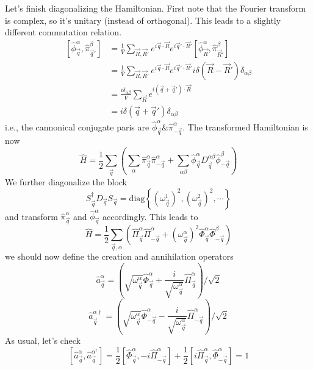 Let's finish diagonalizing the Hamiltonian. First note that the Fourier transform is complex, so it's unitary (instead of orthogonal). This leads to a slightly different commutation relation.
\begin{align*}
    \left[ \hat{\phi}_{\vec{q}}^{\alpha},\hat{\pi}_{\vec{q}'}^{\beta} \right] &=\frac{1}{V}\sum_{\vec{R},\vec{R}'}{e^{i\vec{q}\cdot \vec{R}}e^{i\vec{q}'\cdot \vec{R}'}\left[ \hat{\phi}_{\vec{R}}^{\alpha},\hat{\pi}_{\vec{R}'}^{\beta} \right]}\\
    &=\frac{1}{V}\sum_{\vec{R},\vec{R}'}{e^{i\vec{q}\cdot \vec{R}}e^{i\vec{q}'\cdot \vec{R}'}i\delta \left( \vec{R}-\vec{R}' \right) \delta _{\alpha \beta}}\\
    &=\frac{i\delta _{\alpha \beta}}{V}\sum_{\vec{R}}{e^{i\left( \vec{q}+\vec{q}' \right) \cdot \vec{R}}}\\
    &=i\delta \left( \vec{q}+\vec{q}' \right) \delta _{\alpha \beta}
\end{align*}
i.e., the cannonical conjugate paris are $\hat{\phi}_{\vec{q}}^\alpha \& \hat{\pi}_{-\vec{q}}^\alpha$. The transformed Hamiltonian is now
\[ \hat{H}=\frac{1}{2}\sum_{\vec{q}}{\left( \sum_{\alpha}{\hat{\pi}_{\vec{q}}^{\alpha}\hat{\pi}_{-\vec{q}}^{\alpha}}+\sum_{\alpha \beta}{\hat{\phi}_{\vec{q}}^{\alpha}D_{\vec{q}}^{\alpha \beta}\hat{\phi}_{-\vec{q}}^{\beta}} \right)}\]
We further diagonalize the block
\[ S_{\vec{q}}^{\dagger}D_{\vec{q}}S_{\vec{q}}=\mathrm{diag}\left\{ \left( \omega _{\vec{q}}^{1} \right) ^2,\left( \omega _{\vec{q}}^{2} \right) ^2,\cdots \right\} \]
and transform $\hat{\pi}_{\vec{q}}^\alpha$ and $\hat{\phi}_{\vec{q}}^\alpha$ accordingly. This leads to
\[ \hat{H}=\frac{1}{2}\sum_{\vec{q},\alpha}{\left( \hat{\Pi}_{\vec{q}}^{\alpha}\hat{\Pi}_{-\vec{q}}^{\alpha}+\left( \omega _{\vec{q}}^{\alpha} \right) ^2\hat{\Phi}_{\vec{q}}^{\alpha}\hat{\Phi}_{-\vec{q}}^{\beta} \right)}\]
we should now define the creation and annihilation operators
\[ \hat{a}_{\vec{q}}^{\alpha}=\left( \sqrt{\omega _{\vec{q}}^{\alpha}}\hat{\Phi}_{\vec{q}}^{\alpha}+\frac{i}{\sqrt{\omega _{\vec{q}}^{\alpha}}}\hat{\Pi}_{\vec{q}}^{\alpha} \right) /\sqrt{2}\]
\[ \hat{a}_{\vec{q}}^{\alpha \dagger}=\left( \sqrt{\omega _{\vec{q}}^{\alpha}}\hat{\Phi}_{-\vec{q}}^{\alpha}-\frac{i}{\sqrt{\omega _{\vec{q}}^{\alpha}}}\hat{\Pi}_{-\vec{q}}^{\alpha} \right) /\sqrt{2} \]
As usual, let's check
\[ \left[ \hat{a}_{\vec{q}}^{\alpha},\hat{a}_{\vec{q}}^{\alpha ^{\dagger}} \right] =\frac{1}{2}\left[ \hat{\Phi}_{\vec{q}}^{\alpha},-i\hat{\Pi}_{-\vec{q}}^{\alpha} \right] +\frac{1}{2}\left[ i\hat{\Pi}_{\vec{q}}^{\alpha},\hat{\Phi}_{-\vec{q}}^{\alpha} \right] =1\]
